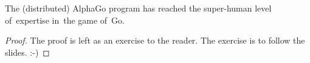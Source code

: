 \documentclass[a4paper,10pt]{article}
\begin{document}
\begin{theorem}
  The (distributed) AlphaGo program has reached the super-human level of~expertise in~the game of~Go.
\end{theorem}

\begin{proof}
  The proof is left as an exercise to the reader.
  The exercise is to follow the slides.
  :-)
\end{proof}

% 
% 
% 
% 
% 
% 
% 
% 
% 
% 
% 
% 
% 
% 
\end{document}
